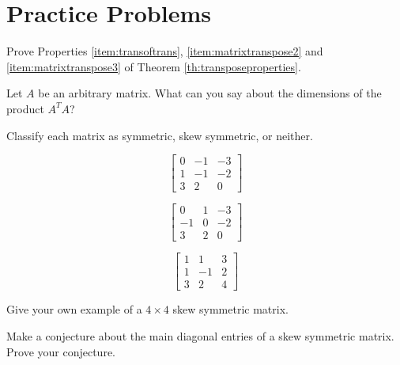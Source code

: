 \documentclass{ximera}
\begin{document}
\section*{Practice Problems}


\begin{problem} Prove Properties \ref{item:transoftrans}, \ref{item:matrixtranspose2} and \ref{item:matrixtranspose3} of Theorem \ref{th:transposeproperties}.
\end{problem}

\begin{problem} Let $A$ be an arbitrary matrix.  What can you say about the dimensions of the product $A^TA$?
\end{problem}

\begin{problem}
Classify each matrix as symmetric, skew symmetric, or neither.
\begin{problem}
$$\begin{bmatrix}
0 & -1 & -3\\
1 & -1 & -2\\
3 &  2 &  0
\end{bmatrix}$$
\begin{multipleChoice}
   \end{multipleChoice}
\end{problem}
\begin{problem}
$$\begin{bmatrix}
0 & 1 & -3\\
-1 & 0 & -2\\
3 &  2 &  0
\end{bmatrix}$$
\begin{multipleChoice}
   \end{multipleChoice}

\end{problem}
\begin{problem}
$$\begin{bmatrix}
1 & 1 & 3\\
1 & -1 & 2\\
3 &  2 &  4
\end{bmatrix}$$
\begin{multipleChoice}
   \end{multipleChoice}
\end{problem}
\end{problem}

\begin{problem}Give your own example of a $4\times 4$ skew symmetric matrix.
\end{problem}

\begin{problem} Make a conjecture about the main diagonal entries of a skew symmetric matrix.  Prove your conjecture.
\end{problem}
\end{document}

